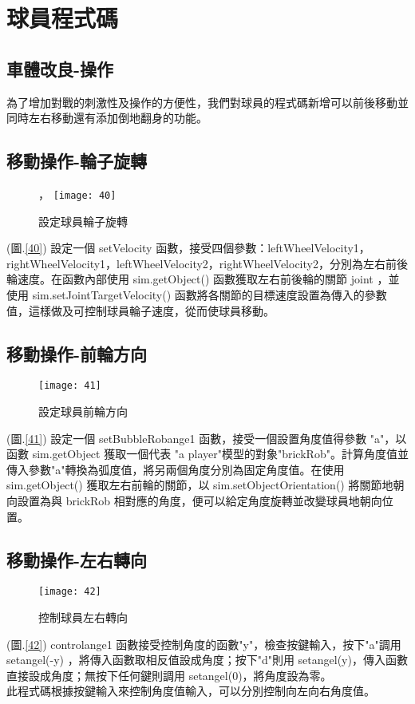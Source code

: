 \chapter{球員程式碼}
\renewcommand{\baselinestretch}{10.0} %
\setcounter{page}{4}  %
\fontsize{14pt}{2.5pt}\sectionef
\section{車體改良-操作}
  為了增加對戰的刺激性及操作的方便性，我們對球員的程式碼新增可以前後移動並同時左右移動還有添加倒地翻身的功能。\\[1pt]

\section{移動操作-輪子旋轉}
\begin{figure}[hbt!]
\begin{center}，
\texttt{[image: 40]}
\caption{\Large 設定球員輪子旋轉}\label{fig.40}
\end{center}
\end{figure}
(圖.\ref{40}) 設定一個 setVelocity 函數，接受四個參數：leftWheelVelocity1，rightWheelVelocity1，leftWheelVelocity2，rightWheelVelocity2，分別為左右前後輪速度。在函數內部使用 sim.getObject() 函數獲取左右前後輪的關節 joint ，並使用 sim.setJointTargetVelocity() 函數將各關節的目標速度設置為傳入的參數值，這樣做及可控制球員輪子速度，從而使球員移動。\\
\newpage
\section{移動操作-前輪方向}
\begin{figure}[hbt!]
\begin{center}
\texttt{[image: 41]}
\caption{\Large 設定球員前輪方向}\label{fig.41}
\end{center}
\end{figure}
(圖.\ref{41}) 設定一個 setBubbleRobange1 函數，接受一個設置角度值得參數 "a"，以函數 sim.getObject 獲取一個代表 "a player"模型的對象"brickRob"。計算角度值並傳入參數"a"轉換為弧度值，將另兩個角度分別為固定角度值。在使用 sim.getObject() 獲取左右前輪的關節，以 sim.setObjectOrientation() 將關節地朝向設置為與 brickRob 相對應的角度，便可以給定角度旋轉並改變球員地朝向位置。\\
\section{移動操作-左右轉向}
\begin{figure}[hbt!]
\begin{center}
\texttt{[image: 42]}
\caption{\Large 控制球員左右轉向}\label{fig.42}
\end{center}
\end{figure}
(圖.\ref{42}) controlange1 函數接受控制角度的函數"y"，檢查按鍵輸入，按下"a"調用 setangel(-y) ，將傳入函數取相反值設成角度；按下"d"則用 setangel(y)，傳入函數直接設成角度；無按下任何鍵則調用 setangel(0)，將角度設為零。\\
  此程式碼根據按鍵輸入來控制角度值輸入，可以分別控制向左向右角度值。\\
